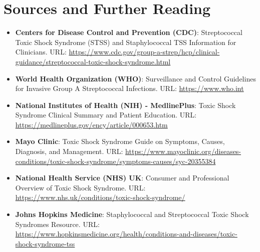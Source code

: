 \section*{Sources and Further Reading}
\begin{itemize}
    \item \textbf{Centers for Disease Control and Prevention (CDC)}: Streptococcal Toxic Shock Syndrome (STSS) and Staphylococcal TSS Information for Clinicians. URL: \url{https://www.cdc.gov/group-a-strep/hcp/clinical-guidance/streptococcal-toxic-shock-syndrome.html}
    \item \textbf{World Health Organization (WHO)}: Surveillance and Control Guidelines for Invasive Group A Streptococcal Infections. URL: \url{https://www.who.int}
    \item \textbf{National Institutes of Health (NIH) - MedlinePlus}: Toxic Shock Syndrome Clinical Summary and Patient Education. URL: \url{https://medlineplus.gov/ency/article/000653.htm}
    \item \textbf{Mayo Clinic}: Toxic Shock Syndrome Guide on Symptoms, Causes, Diagnosis, and Management. URL: \url{https://www.mayoclinic.org/diseases-conditions/toxic-shock-syndrome/symptoms-causes/syc-20355384}
    \item \textbf{National Health Service (NHS) UK}: Consumer and Professional Overview of Toxic Shock Syndrome. URL: \url{https://www.nhs.uk/conditions/toxic-shock-syndrome/}
    \item \textbf{Johns Hopkins Medicine}: Staphylococcal and Streptococcal Toxic Shock Syndromes Resource. URL: \url{https://www.hopkinsmedicine.org/health/conditions-and-diseases/toxic-shock-syndrome-tss}
\end{itemize}